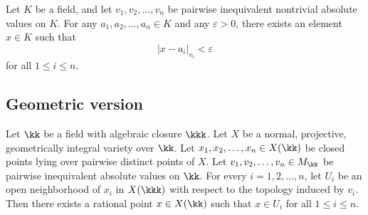 
    \begin{theorem}\label{theorem:artin_whaples_approximations}
        Let \(K\) be a field, and let \(v_1, v_2, \ldots, v_n\) be pairwise inequivalent nontrivial absolute values on \(K\). For any \(a_1, a_2, \ldots, a_n \in K\) and any \(\varepsilon > 0\), there exists an element \(x \in K\) such that
        \[
            |x - a_i|_{v_i} < \varepsilon
        \]
        for all \(1 \leq i \leq n\).
    \end{theorem}


\subsection{Geometric version}

    \begin{theorem}\label{thm:Artin_whaples_approximation_on_varieties}
        Let \(\kk\) be a field with algebraic closure \(\kkk\).
        Let \(X\) be a normal, projective, geometrically integral variety over \(\kk\).
        Let \(x_1, x_2, \ldots, x_n \in X(\kk)\) be closed points lying over pairwise distinct points of \(X\).
        Let \(v_1, v_2, \ldots, v_n \in M_\kk\) be pairwise inequivalent absolute values on \(\kk\).
        For every \(i = 1, 2, \ldots, n\), let \(U_i\) be an open neighborhood of \(x_i\) in \(X(\kkk)\) with respect to the topology induced by \(v_i\).
        Then there exists a rational point \(x \in X(\kk)\) such that \(x \in U_i\) for all \(1 \leq i \leq n\).
    \end{theorem}

